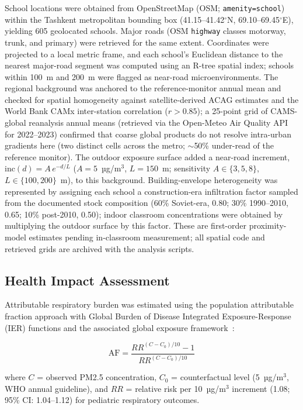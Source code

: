 \documentclass[11pt,a4paper]{article}
\begin{document}
School locations were obtained from OpenStreetMap (OSM; \texttt{amenity=school}) within the Tashkent metropolitan bounding box (41.15--41.42$^{\circ}$N, 69.10--69.45$^{\circ}$E), yielding 605 geolocated schools. Major roads (OSM \texttt{highway} classes motorway, trunk, and primary) were retrieved for the same extent. Coordinates were projected to a local metric frame, and each school's Euclidean distance to the nearest major-road segment was computed using an R-tree spatial index; schools within 100~m and 200~m were flagged as near-road microenvironments. The regional background was anchored to the reference-monitor annual mean and checked for spatial homogeneity against satellite-derived ACAG estimates and the World Bank CAMx inter-station correlation ($r>0.85$); a 25-point grid of CAMS-global reanalysis annual means (retrieved via the Open-Meteo Air Quality API for 2022--2023) confirmed that coarse global products do not resolve intra-urban gradients here (two distinct cells across the metro; $\sim$50\% under-read of the reference monitor). The outdoor exposure surface added a near-road increment, $\mathrm{inc}(d)=A\,e^{-d/L}$ ($A=5$~µg/m$^3$, $L=150$~m; sensitivity $A\in\{3,5,8\}$, $L\in\{100,200\}$~m), to this background. Building-envelope heterogeneity was represented by assigning each school a construction-era infiltration factor sampled from the documented stock composition (60\% Soviet-era, 0.80; 30\% 1990--2010, 0.65; 10\% post-2010, 0.50); indoor classroom concentrations were obtained by multiplying the outdoor surface by this factor. These are first-order proximity-model estimates pending in-classroom measurement; all spatial code and retrieved grids are archived with the analysis scripts.

\subsection{Health Impact Assessment}

Attributable respiratory burden was estimated using the population attributable fraction approach with Global Burden of Disease Integrated Exposure-Response (IER) functions and the associated global exposure framework~\cite{burnett2014integrated,cohen2017estimates,brauer2016ambient,shaddick2018data,lelieveld2015contribution}:

\begin{equation}
\text{AF} = \frac{RR^{(C-C_0)/10} - 1}{RR^{(C-C_0)/10}}
\end{equation}

\noindent where $C$ = observed PM2.5 concentration, $C_0$ = counterfactual level (5~µg/m$^3$, WHO annual guideline), and $RR$ = relative risk per 10~µg/m$^3$ increment (1.08; 95\% CI: 1.04--1.12) for pediatric respiratory outcomes.
\end{document}
